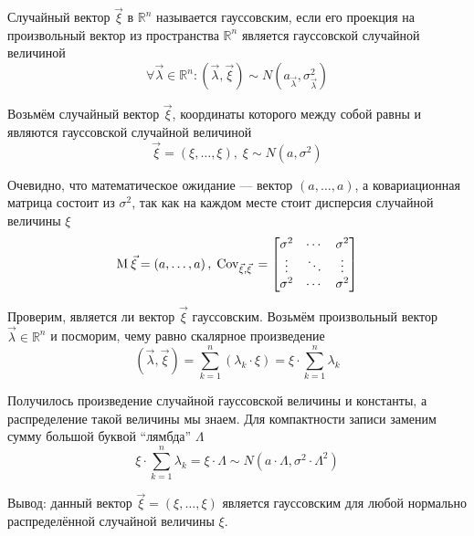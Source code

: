 \begin{definition}
    \label{def:gaussianVector}
    Случайный вектор $\vec{\xi}$ в $\mathbb{R}^n$ называется гауссовским, если
    его проекция на произвольный вектор из пространства $\mathbb{R}^n$
    является гауссовской случайной величиной
    $$\forall \vec{\lambda} \in \mathbb{R}^n:
        \left( \vec{\lambda}, \vec{\xi} \right)
            \sim N\left( a_{\vec{\lambda}}, \sigma_{\vec{\lambda}}^2 \right)$$
\end{definition}

\begin{example}\label{ex:gaussVectorsIntro}
    Возьмём случайный вектор $\vec{\xi}$, координаты которого между собой равны
    и являются гауссовской случайной величиной
    $$\vec{\xi} = \left( \xi, \dots, \xi \right),\;
        \xi \sim N\left( a, \sigma^2 \right)$$

    Очевидно, что математическое ожидание --- вектор
    $\left( a, \dots, a \right)$, а ковариационная матрица состоит из
    $\sigma^2$, так как на каждом месте стоит дисперсия случайной величины $\xi$
    $$\operatorname{M}_{} \vec{\xi} = \left( a, \dots, a \right),\;
        \operatorname{Cov}_{\vec{\xi}, \vec{\xi}}\, =
        \begin{bmatrix}
            \sigma^2 & \cdots & \sigma^2 \\
            \vdots & \ddots & \vdots \\
            \sigma^2 & \cdots & \sigma^2
        \end{bmatrix}$$

    Проверим, является ли вектор $\vec{\xi}$ гауссовским.
    Возьмём произвольный вектор $\vec{\lambda} \in \mathbb{R}^n$
    и посморим, чему равно скалярное произведение
    $$\left( \vec{\lambda}, \vec{\xi} \right)
        = \sum_{k=1}^{n} \left( \lambda_k \cdot \xi \right)
        = \xi \cdot \sum_{k=1}^{n} \lambda_k$$

    Получилось произведение случайной гауссовской величины и константы,
    а распределение такой величины мы знаем. Для компактности записи
    заменим сумму большой буквой ``лямбда'' $\Lambda$
    $$\xi \cdot \sum_{k=1}^{n} \lambda_k
        = \xi \cdot \Lambda \sim N\left( a \cdot \Lambda,
            \sigma^2 \cdot \Lambda^2 \right)$$

    Вывод: данный вектор $\vec{\xi}=\left( \xi, \dots, \xi \right)$ является
    гауссовским для любой нормально распределённой случайной величины $\xi$.
\end{example}

